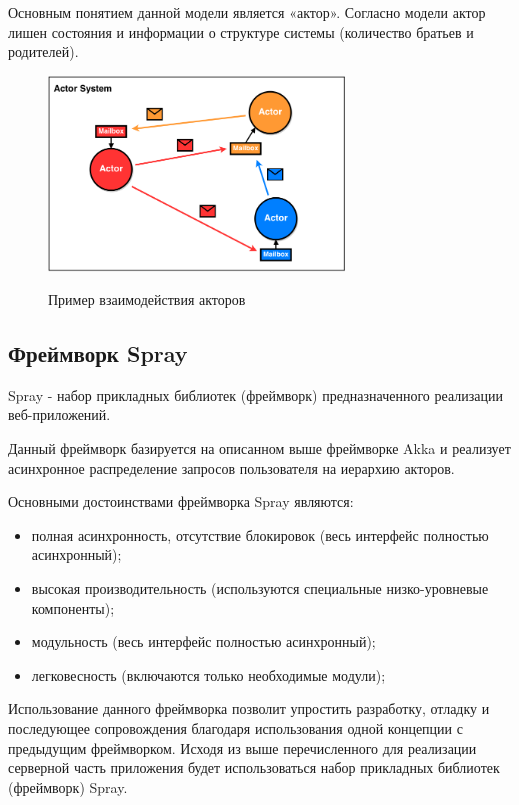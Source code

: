 Основным понятием данной модели является «актор». Согласно модели актор лишен состояния и информации о структуре системы (количество братьев и родителей). 

\begin{figure}[ht]
    \centering
    \includegraphics[width=0.7\textwidth]{figures/actor_model.png}
    \label{fig:techs:akka:actor_model:comulication}
    \caption{Пример взаимодействия акторов}
\end{figure}

\subsection{Фреймворк Spray}
\label{sec:techs:spray}

Spray - набор прикладных библиотек (фреймворк) предназначенного реализации веб-приложений.

Данный фреймворк базируется на описанном выше фреймворке Akka и реализует асинхронное распределение запросов пользователя на иерархию акторов. 

Основными достоинствами фреймворка Spray являются:
\begin{itemize}
  \item полная асинхронность, отсутствие блокировок (весь интерфейс полностью асинхронный);
  \item высокая производительность (используются специальные низко-уровневые компоненты);
  \item модульность (весь интерфейс полностью асинхронный);
  \item легковесность (включаются только необходимые модули);
\end{itemize}

Использование данного фреймворка позволит упростить разработку, отладку и последующее сопровождения благодаря использования одной концепции с предыдущим фреймворком.
Исходя из выше перечисленного для реализации серверной часть приложения будет использоваться набор прикладных библиотек (фреймворк) Spray.